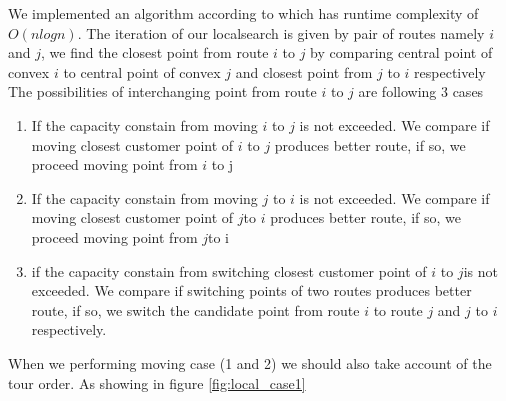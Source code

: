 \documentclass[12pt]{article}
\begin{document}
We implemented an algorithm according to \cite{Berg97} which has runtime complexity of $O(nlogn)$. The iteration of our localsearch is given by pair of routes namely \(i\) and \(j\), we find the closest point from route \(i\) to \(j\) by comparing central point of convex \(i\) to central point of convex \(j\) and closest point from \(j\) to \(i\) respectively The possibilities of interchanging point from route \(i\) to \(j\) are following 3 cases
\begin{enumerate}

	\item If the capacity constain from moving \(i\) to \(j\) is not exceeded. We compare if moving closest customer point of \(i\) to \(j\) produces better route, if so, we proceed moving point from \(i\) to j

	\item If the capacity constain from moving \(j\) to \(i\) is not exceeded. We compare if moving closest customer point of \(j\)to \(i\) produces better route, if so, we proceed moving point from \(j\)to i

	\item if the capacity constain from switching closest customer point of \(i\) to \(j\)is not exceeded. We compare if switching points of two routes produces better route, if so, we switch the candidate point from route \(i\) to route \(j\) and \(j\) to \(i\) respectively.
\end{enumerate}

When we performing moving case (1 and 2) we should also take account of the tour order. As showing in figure \ref{fig:local_case1}

\begin{figure}[!tbp]
	\centering

\end{figure}
\end{document}
